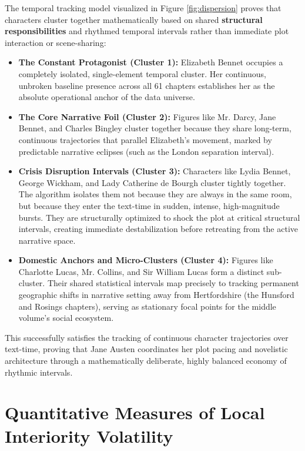 The temporal tracking model visualized in Figure \ref{fig:dispersion} proves that characters cluster together mathematically based on shared \textbf{structural responsibilities} and rhythmed temporal intervals rather than immediate plot interaction or scene-sharing:
\begin{itemize}
    \item \textbf{The Constant Protagonist (Cluster 1):} Elizabeth Bennet occupies a completely isolated, single-element temporal cluster. Her continuous, unbroken baseline presence across all 61 chapters establishes her as the absolute operational anchor of the data universe.
    \item \textbf{The Core Narrative Foil (Cluster 2):} Figures like Mr. Darcy, Jane Bennet, and Charles Bingley cluster together because they share long-term, continuous trajectories that parallel Elizabeth's movement, marked by predictable narrative eclipses (such as the London separation interval).
    \item \textbf{Crisis Disruption Intervals (Cluster 3):} Characters like Lydia Bennet, George Wickham, and Lady Catherine de Bourgh cluster tightly together. The algorithm isolates them not because they are always in the same room, but because they enter the text-time in sudden, intense, high-magnitude bursts. They are structurally optimized to shock the plot at critical structural intervals, creating immediate destabilization before retreating from the active narrative space.
    \item \textbf{Domestic Anchors and Micro-Clusters (Cluster 4):} Figures like Charlotte Lucas, Mr. Collins, and Sir William Lucas form a distinct sub-cluster. Their shared statistical intervals map precisely to tracking permanent geographic shifts in narrative setting away from Hertfordshire (the Hunsford and Rosings chapters), serving as stationary focal points for the middle volume's social ecosystem.
\end{itemize}
This successfully satisfies the tracking of continuous character trajectories over text-time, proving that Jane Austen coordinates her plot pacing and novelistic architecture through a mathematically deliberate, highly balanced economy of rhythmic intervals.

\chapter{Quantitative Measures of Local Interiority Volatility}
\label{ch:mahalanobis_volatility}

